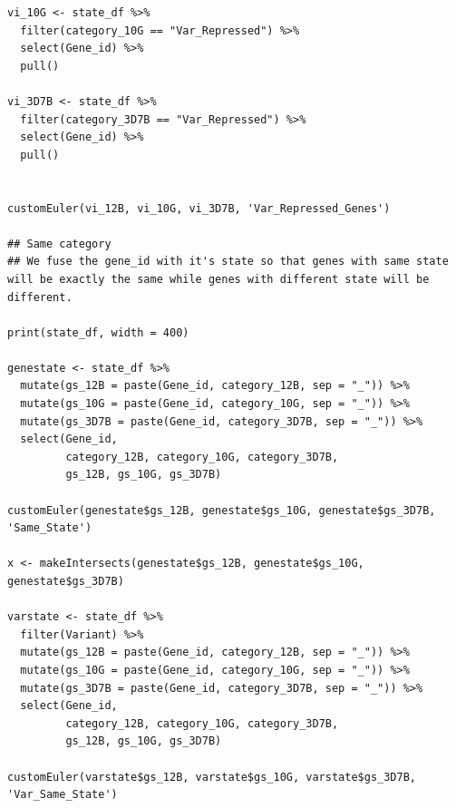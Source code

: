 \documentclass[11pt]{article}
\begin{document}
\begin{verbatim}
vi_10G <- state_df %>%
  filter(category_10G == "Var_Repressed") %>%
  select(Gene_id) %>%
  pull()

vi_3D7B <- state_df %>%
  filter(category_3D7B == "Var_Repressed") %>%
  select(Gene_id) %>%
  pull()


customEuler(vi_12B, vi_10G, vi_3D7B, 'Var_Repressed_Genes')

## Same category
## We fuse the gene_id with it's state so that genes with same state will be exactly the same while genes with different state will be different.

print(state_df, width = 400)

genestate <- state_df %>%
  mutate(gs_12B = paste(Gene_id, category_12B, sep = "_")) %>%
  mutate(gs_10G = paste(Gene_id, category_10G, sep = "_")) %>%
  mutate(gs_3D7B = paste(Gene_id, category_3D7B, sep = "_")) %>%
  select(Gene_id,
         category_12B, category_10G, category_3D7B,
         gs_12B, gs_10G, gs_3D7B)

customEuler(genestate$gs_12B, genestate$gs_10G, genestate$gs_3D7B, 'Same_State')

x <- makeIntersects(genestate$gs_12B, genestate$gs_10G, genestate$gs_3D7B)

varstate <- state_df %>%
  filter(Variant) %>%
  mutate(gs_12B = paste(Gene_id, category_12B, sep = "_")) %>%
  mutate(gs_10G = paste(Gene_id, category_10G, sep = "_")) %>%
  mutate(gs_3D7B = paste(Gene_id, category_3D7B, sep = "_")) %>%
  select(Gene_id,
         category_12B, category_10G, category_3D7B,
         gs_12B, gs_10G, gs_3D7B)

customEuler(varstate$gs_12B, varstate$gs_10G, varstate$gs_3D7B, 'Var_Same_State')
\end{verbatim}
\end{document}
